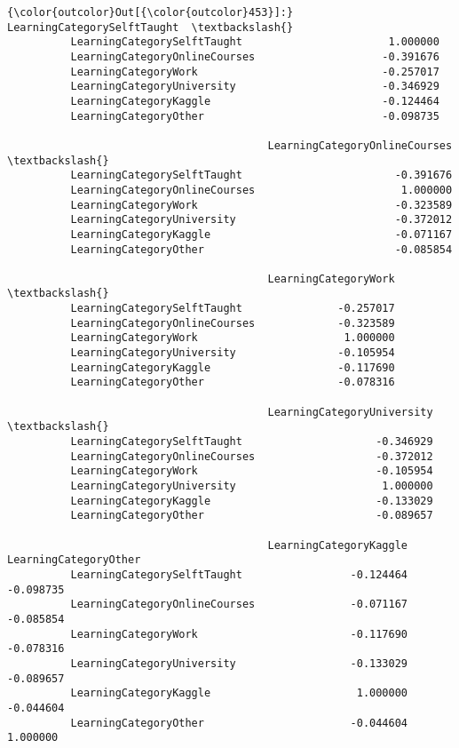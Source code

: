 \documentclass[11pt]{article}
\begin{document}
\begin{Verbatim}[commandchars=\\\{\}]
{\color{outcolor}Out[{\color{outcolor}453}]:}                                LearningCategorySelftTaught  \textbackslash{}
          LearningCategorySelftTaught                       1.000000   
          LearningCategoryOnlineCourses                    -0.391676   
          LearningCategoryWork                             -0.257017   
          LearningCategoryUniversity                       -0.346929   
          LearningCategoryKaggle                           -0.124464   
          LearningCategoryOther                            -0.098735   
          
                                         LearningCategoryOnlineCourses  \textbackslash{}
          LearningCategorySelftTaught                        -0.391676   
          LearningCategoryOnlineCourses                       1.000000   
          LearningCategoryWork                               -0.323589   
          LearningCategoryUniversity                         -0.372012   
          LearningCategoryKaggle                             -0.071167   
          LearningCategoryOther                              -0.085854   
          
                                         LearningCategoryWork  \textbackslash{}
          LearningCategorySelftTaught               -0.257017   
          LearningCategoryOnlineCourses             -0.323589   
          LearningCategoryWork                       1.000000   
          LearningCategoryUniversity                -0.105954   
          LearningCategoryKaggle                    -0.117690   
          LearningCategoryOther                     -0.078316   
          
                                         LearningCategoryUniversity  \textbackslash{}
          LearningCategorySelftTaught                     -0.346929   
          LearningCategoryOnlineCourses                   -0.372012   
          LearningCategoryWork                            -0.105954   
          LearningCategoryUniversity                       1.000000   
          LearningCategoryKaggle                          -0.133029   
          LearningCategoryOther                           -0.089657   
          
                                         LearningCategoryKaggle  LearningCategoryOther  
          LearningCategorySelftTaught                 -0.124464              -0.098735  
          LearningCategoryOnlineCourses               -0.071167              -0.085854  
          LearningCategoryWork                        -0.117690              -0.078316  
          LearningCategoryUniversity                  -0.133029              -0.089657  
          LearningCategoryKaggle                       1.000000              -0.044604  
          LearningCategoryOther                       -0.044604               1.000000  
\end{Verbatim}
            
\end{document}
